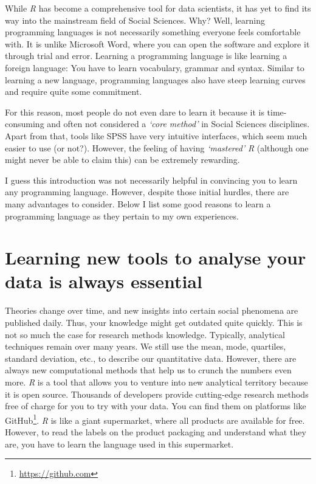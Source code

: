 \documentclass[
  letterpaper,
]{krantz}
\renewcommand{\href}[2]{#2\footnote{\url{#1}}}
\begin{document}
While \emph{R} has become a comprehensive tool for data scientists, it
has yet to find its way into the mainstream field of Social Sciences.
Why? Well, learning programming languages is not necessarily something
everyone feels comfortable with. It is unlike Microsoft Word, where you
can open the software and explore it through trial and error. Learning a
programming language is like learning a foreign language: You have to
learn vocabulary, grammar and syntax. Similar to learning a new
language, programming languages also have steep learning curves and
require quite some commitment.

For this reason, most people do not even dare to learn it because it is
time-consuming and often not considered a \emph{`core method'} in Social
Sciences disciplines. Apart from that, tools like SPSS have very
intuitive interfaces, which seem much easier to use (or not?). However,
the feeling of having \emph{`mastered'} \emph{R} (although one might
never be able to claim this) can be extremely rewarding.

I guess this introduction was not necessarily helpful in convincing you
to learn any programming language. However, despite those initial
hurdles, there are many advantages to consider. Below I list some good
reasons to learn a programming language as they pertain to my own
experiences.

\section{Learning new tools to analyse your data is always
essential}\label{sec-learning-new-tools-to-analyse-your-data-is-always-essential}

Theories change over time, and new insights into certain social
phenomena are published daily. Thus, your knowledge might get outdated
quite quickly. This is not so much the case for research methods
knowledge. Typically, analytical techniques remain over many years. We
still use the mean, mode, quartiles, standard deviation, etc., to
describe our quantitative data. However, there are always new
computational methods that help us to crunch the numbers even more.
\emph{R} is a tool that allows you to venture into new analytical
territory because it is open source. Thousands of developers provide
cutting-edge research methods free of charge for you to try with your
data. You can find them on platforms like
\href{https://github.com}{GitHub}. \emph{R} is like a giant supermarket,
where all products are available for free. However, to read the labels
on the product packaging and understand what they are, you have to learn
the language used in this supermarket.
\end{document}
